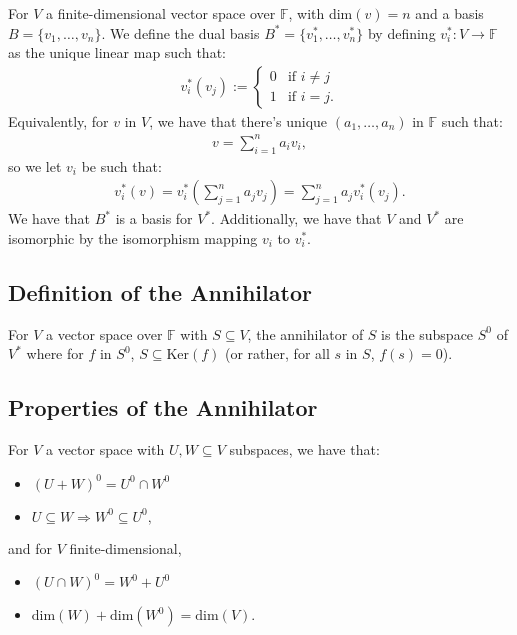 \documentclass[a4paper, 12pt, twoside]{article}
\begin{document}
For $V$ a finite-dimensional vector space over $\mathbb{F}$, with 
dim$(v) = n$ and a basis $B = \{v_1, \ldots, v_n\}$. 
We define the dual basis $B^* = \{v_1^*, \ldots, v_n^*\}$
by defining $v_i^* : V \to \mathbb{F}$ as the unique linear map
such that: \begin{gather*}
  v_i^*(v_j) := \begin{cases}
    0 & \text{if } i \neq j \\
    1 & \text{if } i = j.
  \end{cases}
\end{gather*} 
\newpage
Equivalently, for $v$ in $V$, we have that there's 
unique $(a_1, \ldots, a_n)$ in $\mathbb{F}$ such that: \begin{gather*}
  v = \sum_{i = 1}^n a_iv_i,
\end{gather*} so we let $v_i$ be such that: \begin{gather*}
  v_i^*(v) = v_i^*\left(\sum_{j = 1}^n a_jv_j\right) 
  = \sum_{j = 1}^n a_jv_i^*(v_j).
\end{gather*} We have that $B^*$ is a basis for $V^*$. Additionally,
we have that $V$ and $V^*$ are isomorphic by the isomorphism mapping
$v_i$ to $v_i^*$.

\subsection{Definition of the Annihilator}

For $V$ a vector space over $\mathbb{F}$ with $S \subseteq V$,
the annihilator of $S$ is the subspace $S^0$ of $V^*$ where
for $f$ in $S^0$, $S \subseteq \text{Ker}(f)$ (or rather, 
for all $s$ in $S$, $f(s) = 0$).

\subsection{Properties of the Annihilator}

For $V$ a vector space with $U, W \subseteq V$
subspaces, we have that: \begin{itemize}
  \item $(U + W)^0 = U^0 \cap W^0$
  \item $U \subseteq W \Rightarrow W^0 \subseteq U^0,$
\end{itemize} and for $V$ finite-dimensional, \begin{itemize}
  \item $(U \cap W)^0 = W^0 + U^0$
  \item $\text{dim}(W) + \text{dim}(W^0) = \text{dim}(V).$
\end{itemize}
\end{document}
